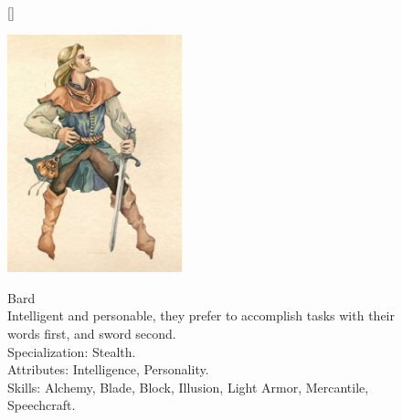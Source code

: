 \documentclass[12pt]{book}
\begin{document}
\begin{figure}[H]
[\FBwidth]
{\caption*{Bard\\

Intelligent and personable, they prefer to accomplish tasks with their words first, and sword second.\\

Specialization: Stealth.\\

Attributes: Intelligence, Personality.\\

Skills: Alchemy, Blade, Block, Illusion, Light Armor, Mercantile, Speechcraft.}\label{fig:test}}
{\includegraphics[width=0.45\textwidth]{Bard.png}}
\end{figure}
\end{document}
